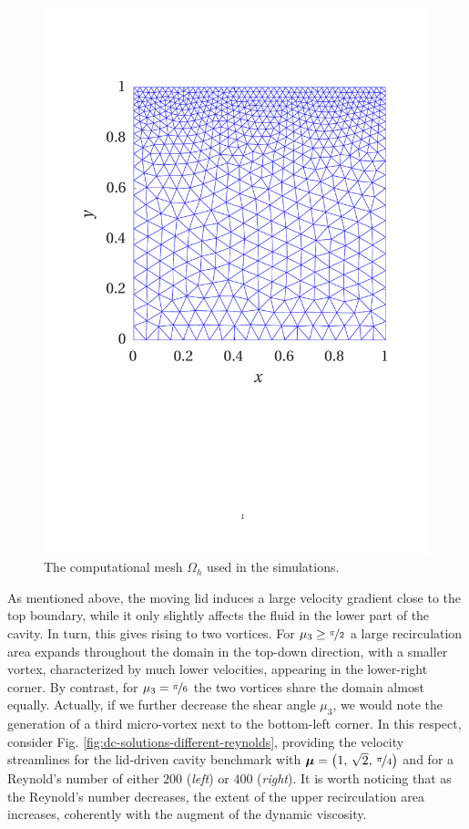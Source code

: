 \documentclass[12pt, a4paper, twoside, openright, notitlepage]{report}
\numberwithin{equation}{chapter}
\theoremstyle{theorem}
\theoremstyle{definition}
\theoremstyle{remark}
\theoremstyle{proposition}
\numberwithin{figure}{chapter}
\newcommand{\bg}[1]{\boldsymbol{#1}}
\begin{document}
		\begin{figure}[H]
			\center
			\includegraphics[scale = 0.375, trim = {2cm 9cm 1.5cm 3.5cm}, clip]{dc_mesh}
			
			\vspace*{-0.2cm}
			
			\caption{The computational mesh $\Omega_h$ used in the simulations.}
			\label{fig:dc-mesh}
		\end{figure}
				
		As mentioned above, the moving lid induces a large velocity gradient close to the top boundary, while it only slightly affects the fluid in the lower part of the cavity. In turn, this gives rising to two vortices. For $\mu_3 \geq \nicefrac{\pi}{2}$ a large recirculation area expands throughout the domain in the top-down direction, with a smaller vortex, characterized by much lower velocities, appearing in the lower-right corner. By contrast, for $\mu_3 = \nicefrac{\pi}{6}$ the two vortices share the domain almost equally. Actually, if we further decrease the shear angle $\mu_3$, we would note the generation of a third micro-vortex next to the bottom-left corner. In this respect, consider Fig. \ref{fig:dc-solutions-different-reynolds}, providing the velocity streamlines for the lid-driven cavity benchmark with $\bg{\mu} = \big( 1, \, \sqrt{2}, \, \nicefrac{\pi}{4} \big)$ and for a Reynold's number of either $200$ (\emph{left}) or $400$ (\emph{right}). It is worth noticing that as the Reynold's number decreases, the extent of the upper recirculation area increases, coherently with the augment of the dynamic viscosity. 
		
\end{document}
